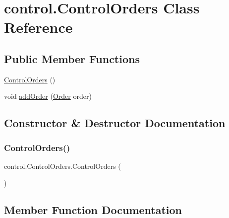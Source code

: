 \hypertarget{classcontrol_1_1_control_orders}{}\section{control.\+Control\+Orders Class Reference}
\label{classcontrol_1_1_control_orders}
\subsection*{Public Member Functions}
\begin{DoxyCompactItemize}
\item 
\mbox{\hyperlink{classcontrol_1_1_control_orders_a197c6e5d902c1e6448d856b423647275}{Control\+Orders}} ()
\item 
void \mbox{\hyperlink{classcontrol_1_1_control_orders_a493848f32197cff514cb9ff6e7d3ed05}{add\+Order}} (\mbox{\hyperlink{classclases_1_1_order}{Order}} order)
\end{DoxyCompactItemize}


\subsection{Constructor \& Destructor Documentation}
\mbox{\label{classcontrol_1_1_control_orders_a197c6e5d902c1e6448d856b423647275}} 
\subsubsection{\texorpdfstring{Control\+Orders()}{ControlOrders()}}
{\footnotesize\ttfamily control.\+Control\+Orders.\+Control\+Orders (\begin{DoxyParamCaption}{ }\end{DoxyParamCaption})}



\subsection{Member Function Documentation}
\mbox{\label{classcontrol_1_1_control_orders_a493848f32197cff514cb9ff6e7d3ed05}} 
